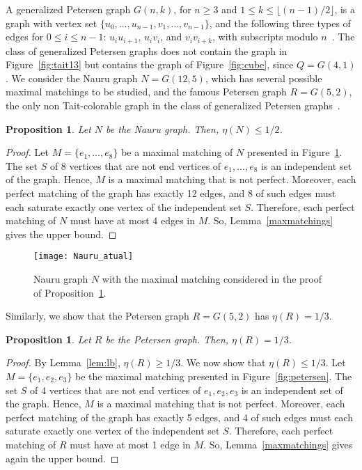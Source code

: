 \documentclass{article}
\newtheorem{proposition}[thm]{Proposition}
\begin{document}
A generalized Petersen graph $G(n,k)$, for $n \geq 3$ and $1 \leq k \leq \lfloor (n-1)/2 \rfloor$, is a graph with vertex set $\{u_0,\ldots,u_{n-1},v_1,\ldots,v_{n-1}\}$, and the following three types of edges for $0 \leq i \leq n-1$: $u_iu_{i+1}$, $u_iv_i$, and $v_iv_{i+k}$, with subscripts modulo $n$~\cite{Watkins_gen}. The class of generalized Petersen graphs does not contain the graph in Figure~\ref{fig:tait13} but contains the graph of Figure~\ref{fig:cube}, since $Q=G(4,1)$. We consider the Nauru graph $N=G(12,5)$, which has several possible maximal matchings to be studied, and the famous Petersen graph $R=G(5,2)$, the only non Tait-colorable graph in the class of generalized Petersen graphs~\cite{Castagna1972}.

\begin{proposition} \label{prop:bipartiteubNauru}
Let $N$ be the Nauru graph. Then, $\eta(N) \leq 1/2$.
\end{proposition}

\begin{proof}
Let $M=\{e_1,\dots,e_8\}$ be a maximal matching of $N$ presented in Figure~\ref{fig:nauru}. The set $S$ of 8 vertices that are not end vertices of $e_1,\dots,e_8$ is an independent set of the graph. Hence, $M$ is a maximal matching that is not perfect. Moreover, each perfect matching of the graph has exactly 12 edges, and 8 of such edges must each saturate exactly one vertex of the independent set $S$. Therefore, each perfect matching of $N$ must have at most 4 edges in $M$. So, Lemma~\ref{maxmatchings} gives the upper bound.
\end{proof}

\begin{figure}[ht]
\centering
\texttt{[image: Nauru\_atual]}
\caption{Nauru graph $N$ with the maximal matching considered in the proof of Proposition~\ref{prop:bipartiteubNauru}.}
\label{fig:nauru}
\end{figure}

Similarly, we show that the Petersen graph $R = G(5,2)$ has $\eta(R) = 1/3$.

\begin{proposition} \label{lem:petersenub}
Let $R$ be the Petersen graph. Then, $\eta(R) = 1/3$.
\end{proposition}
\begin{proof}
By Lemma~\ref{lem:lb}, $\eta(R) \geq 1/3$. We now show that $\eta(R) \leq 1/3$. Let $M=\{e_1,e_2,e_3\}$ be the maximal matching presented in Figure~\ref{fig:petersen}. The set $S$ of 4 vertices that are not end vertices of $e_1,e_2,e_3$ is an independent set of the graph. Hence, $M$ is a maximal matching that is not perfect. Moreover, each perfect matching of the graph has exactly 5 edges, and 4 of such edges must each saturate exactly one vertex of the independent set $S$. Therefore, each perfect matching of $R$ must have at most 1 edge in $M$. So, Lemma~\ref{maxmatchings} gives again the upper bound.
\end{proof}
\end{document}
